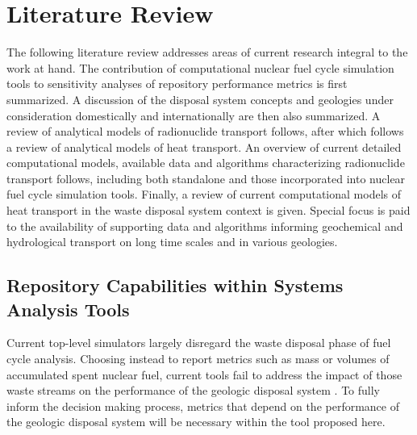\chapter{Literature Review}
\label{ch:litrev}

The following literature review addresses areas of current research
integral to the work at hand. The contribution of computational nuclear fuel
cycle simulation tools to sensitivity analyses of repository performance
metrics is first summarized. A discussion of the disposal system concepts and 
geologies under consideration domestically and internationally are then also 
summarized.  A review of analytical models of radionuclide transport
follows, after which follows a review of analytical models of heat transport.
An overview of current detailed computational models, available data and
algorithms characterizing radionuclide transport follows, including both standalone
and those incorporated into nuclear fuel cycle simulation tools. Finally, a
review of current computational models of heat transport in the waste disposal
system context is given.  Special focus is paid to the availability of
supporting data and algorithms informing geochemical and hydrological
transport on long time scales and in various geologies. 

\section{Repository Capabilities within Systems Analysis Tools}
\label{sec:SA_repos}



Current top-level simulators largely disregard the waste disposal phase of fuel
cycle analysis. Choosing instead to report metrics such as mass or volumes of
accumulated spent nuclear fuel, current tools fail to address the impact of
those waste streams on the performance of the geologic disposal system
\cite{wilson_comparing_2011}.  To fully inform the decision making process, 
metrics that depend on the performance of the geologic disposal system will be
necessary within the tool proposed here. 

